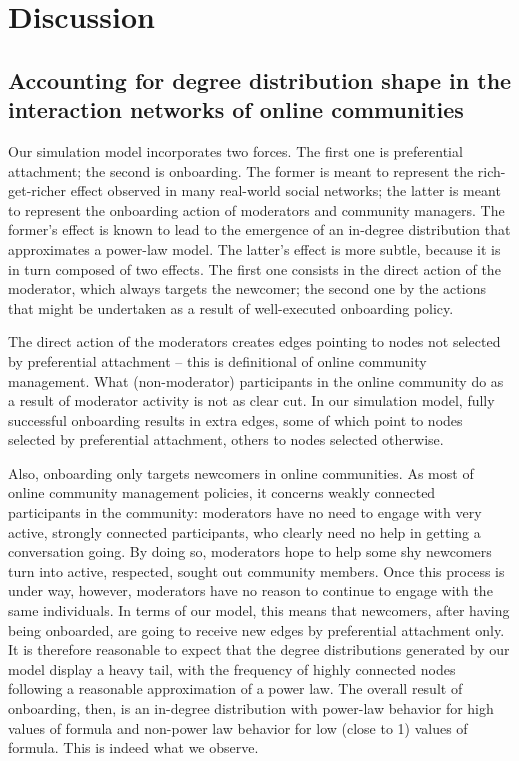 \section{Discussion}

\subsection{Accounting for degree distribution shape in the interaction networks of online communities}

Our simulation model incorporates two forces. The first one is preferential attachment; the second is onboarding. The former is meant to represent the rich-get-richer effect observed in many real-world social networks; the latter is meant to represent the onboarding action of moderators and community managers. The former's effect is known to lead to the emergence of an in-degree distribution that approximates a power-law model. The latter's effect is more subtle, because it is in turn composed of two effects. The first one consists in the direct action of the moderator, which  always targets the newcomer; the second one by the actions that might be undertaken as a result of well-executed onboarding policy. 

The direct action of the moderators creates edges pointing to nodes not selected by preferential attachment – this is definitional of online community management. What (non-moderator) participants in the online community do as a result of moderator activity is not as clear cut. In our simulation model, fully successful onboarding results in extra edges, some of which point to nodes selected by preferential attachment, others to nodes selected otherwise. 

Also, onboarding only targets newcomers in online communities. As most of online community management policies, it concerns weakly connected participants in the community: moderators have no need to engage with very active, strongly connected participants, who clearly need no help in getting a conversation going. By doing so, moderators hope to help some shy newcomers turn into active, respected, sought out community members. Once this process is under way, however, moderators have no reason to continue to engage with the same individuals. In terms of our model, this means that newcomers, after having being onboarded, are going to receive new edges by preferential attachment only. It is therefore reasonable to expect that the degree distributions generated by our model display a heavy tail, with the frequency of highly connected nodes following a reasonable approximation of a power law. The overall result of onboarding, then, is an in-degree distribution with power-law behavior for high values of formula and non-power law behavior for low (close to 1) values of formula. This is indeed what we observe. 

